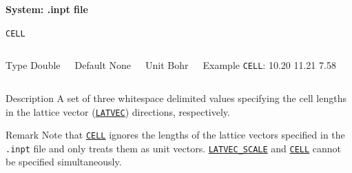 
\begin{frame}[allowframebreaks,c]{} \label{System}

\begin{center}
\Huge \textbf{System: .inpt file}
\end{center}

\end{frame}



\begin{frame}[allowframebreaks]{\texttt{CELL}} \label{CELL}
\vspace*{-12pt}
\begin{columns}
\begin{block}{Type}
Double
\end{block}

\begin{block}{Default}
None
\end{block}

\begin{block}{Unit}
Bohr
\end{block}
    
\begin{block}{Example}
\texttt{CELL}: 10.20 11.21 7.58
\end{block}
\end{columns}
\begin{block}{Description}
A set of three whitespace delimited values specifying the cell lengths in the lattice vector (\hyperlink{LATVEC}{\texttt{LATVEC}}) directions, respectively.
\end{block}

\begin{block}{Remark}
    Note that \hyperlink{CELL}{\texttt{CELL}} ignores the lengths of the lattice vectors specified in the \texttt{.inpt} file and only treats them as unit vectors. \hyperlink{LATVEC_SCALE}{\texttt{LATVEC\_SCALE}} and \hyperlink{CELL}{\texttt{CELL}} cannot be specified simultaneously.
\end{block}

\end{frame}


